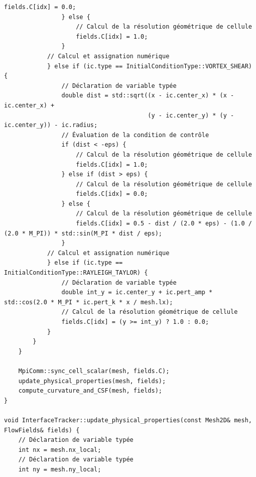 \documentclass[10pt,a4paper,oneside]{book}
\begin{document}
\begin{lstlisting}[language={[11]C++}]
                    fields.C[idx] = 0.0;
                } else {
                    // Calcul de la résolution géométrique de cellule
                    fields.C[idx] = 1.0;
                }
            // Calcul et assignation numérique
            } else if (ic.type == InitialConditionType::VORTEX_SHEAR) {
                // Déclaration de variable typée
                double dist = std::sqrt((x - ic.center_x) * (x - ic.center_x) +
                                        (y - ic.center_y) * (y - ic.center_y)) - ic.radius;
                // Évaluation de la condition de contrôle
                if (dist < -eps) {
                    // Calcul de la résolution géométrique de cellule
                    fields.C[idx] = 1.0;
                } else if (dist > eps) {
                    // Calcul de la résolution géométrique de cellule
                    fields.C[idx] = 0.0;
                } else {
                    // Calcul de la résolution géométrique de cellule
                    fields.C[idx] = 0.5 - dist / (2.0 * eps) - (1.0 / (2.0 * M_PI)) * std::sin(M_PI * dist / eps);
                }
            // Calcul et assignation numérique
            } else if (ic.type == InitialConditionType::RAYLEIGH_TAYLOR) {
                // Déclaration de variable typée
                double int_y = ic.center_y + ic.pert_amp * std::cos(2.0 * M_PI * ic.pert_k * x / mesh.lx);
                // Calcul de la résolution géométrique de cellule
                fields.C[idx] = (y >= int_y) ? 1.0 : 0.0;
            }
        }
    }

    MpiComm::sync_cell_scalar(mesh, fields.C);
    update_physical_properties(mesh, fields);
    compute_curvature_and_CSF(mesh, fields);
}

void InterfaceTracker::update_physical_properties(const Mesh2D& mesh, FlowFields& fields) {
    // Déclaration de variable typée
    int nx = mesh.nx_local;
    // Déclaration de variable typée
    int ny = mesh.ny_local;


\end{lstlisting}
\end{document}
